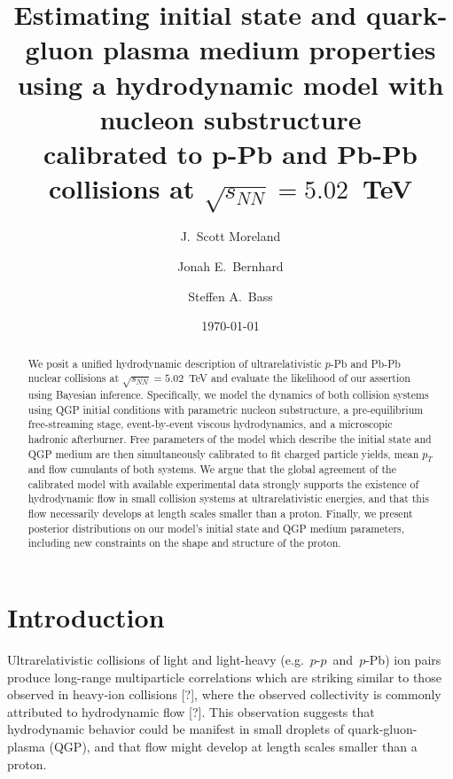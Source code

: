 \documentclass[aps,prc,reprint,amsmath,nofootinbib]{revtex4-1}
\newcommand{\sqrts}{\sqrt{s_{NN}}}
\newcommand{\note}{\textcolor{theblue}{[?]}}
\begin{document}
\title{
  Estimating initial state and quark-gluon plasma medium properties\\
  using a hydrodynamic model with nucleon substructure\\calibrated to p-Pb and Pb-Pb collisions at $\sqrts=5.02$~TeV
}

\author{J.\ Scott Moreland}
\author{Jonah E.\ Bernhard}
\author{Steffen A.\ Bass}

\date{\today}

\begin{abstract}
  We posit a unified hydrodynamic description of ultrarelativistic $p$-Pb and Pb-Pb nuclear collisions at $\sqrts=5.02$~TeV and evaluate the likelihood of our assertion using Bayesian inference.
  Specifically, we model the dynamics of both collision systems using QGP initial conditions with parametric nucleon substructure, a pre-equilibrium free-streaming stage, event-by-event viscous hydrodynamics, and a microscopic hadronic afterburner.
  Free parameters of the model which describe the initial state and QGP medium are then simultaneously calibrated to fit charged particle yields, mean $p_T$ and flow cumulants of both systems.
  We argue that the global agreement of the calibrated model with available experimental data strongly supports the existence of hydrodynamic flow in small collision systems at ultrarelativistic energies, and that this flow necessarily develops at length scales smaller than a proton.
  Finally, we present posterior distributions on our model's initial state and QGP medium parameters, including new constraints on the shape and structure of the proton.
\end{abstract}

\maketitle


\section{Introduction}
  Ultrarelativistic collisions of light and light-heavy \mbox{(e.g.\ $p$-$p$ and $p$-Pb)} ion pairs produce long-range multiparticle correlations which are striking similar to those observed in heavy-ion collisions \note, where the observed collectivity is commonly attributed to hydrodynamic flow \note.
  This observation suggests that hydrodynamic behavior could be manifest in small droplets of quark-gluon-plasma (QGP), and that flow might develop at length scales smaller than a proton.
\end{document}
